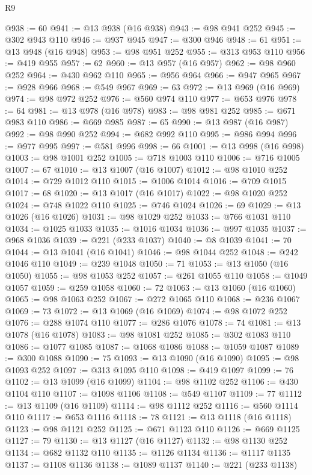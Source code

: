\begin{lexlean}{R9}
\begin{coremodule}
@938 := 60
@941 := @13 @938 (@16 @938)
@943 := @98 @941 @252
@945 := @302 @943 @110
@946 := @937 @945
@947 := @300 @946
@948 := 61
@951 := @13 @948 (@16 @948)
@953 := @98 @951 @252
@955 := @313 @953 @110
@956 := @419 @955
@957 := 62
@960 := @13 @957 (@16 @957)
@962 := @98 @960 @252
@964 := @430 @962 @110
@965 := @956 @964
@966 := @947 @965
@967 := @928 @966
@968 := @549 @967
@969 := 63
@972 := @13 @969 (@16 @969)
@974 := @98 @972 @252
@976 := @560 @974 @110
@977 := @653 @976
@978 := 64
@981 := @13 @978 (@16 @978)
@983 := @98 @981 @252
@985 := @671 @983 @110
@986 := @669 @985
@987 := 65
@990 := @13 @987 (@16 @987)
@992 := @98 @990 @252
@994 := @682 @992 @110
@995 := @986 @994
@996 := @977 @995
@997 := @581 @996
@998 := 66
@1001 := @13 @998 (@16 @998)
@1003 := @98 @1001 @252
@1005 := @718 @1003 @110
@1006 := @716 @1005
@1007 := 67
@1010 := @13 @1007 (@16 @1007)
@1012 := @98 @1010 @252
@1014 := @729 @1012 @110
@1015 := @1006 @1014
@1016 := @709 @1015
@1017 := 68
@1020 := @13 @1017 (@16 @1017)
@1022 := @98 @1020 @252
@1024 := @748 @1022 @110
@1025 := @746 @1024
@1026 := 69
@1029 := @13 @1026 (@16 @1026)
@1031 := @98 @1029 @252
@1033 := @766 @1031 @110
@1034 := @1025 @1033
@1035 := @1016 @1034
@1036 := @997 @1035
@1037 := @968 @1036
@1039 := @221 (@233 @1037)
@1040 := @8 @1039
@1041 := 70
@1044 := @13 @1041 (@16 @1041)
@1046 := @98 @1044 @252
@1048 := @242 @1046 @110
@1049 := @239 @1048
@1050 := 71
@1053 := @13 @1050 (@16 @1050)
@1055 := @98 @1053 @252
@1057 := @261 @1055 @110
@1058 := @1049 @1057
@1059 := @259 @1058
@1060 := 72
@1063 := @13 @1060 (@16 @1060)
@1065 := @98 @1063 @252
@1067 := @272 @1065 @110
@1068 := @236 @1067
@1069 := 73
@1072 := @13 @1069 (@16 @1069)
@1074 := @98 @1072 @252
@1076 := @288 @1074 @110
@1077 := @286 @1076
@1078 := 74
@1081 := @13 @1078 (@16 @1078)
@1083 := @98 @1081 @252
@1085 := @302 @1083 @110
@1086 := @1077 @1085
@1087 := @1068 @1086
@1088 := @1059 @1087
@1089 := @300 @1088
@1090 := 75
@1093 := @13 @1090 (@16 @1090)
@1095 := @98 @1093 @252
@1097 := @313 @1095 @110
@1098 := @419 @1097
@1099 := 76
@1102 := @13 @1099 (@16 @1099)
@1104 := @98 @1102 @252
@1106 := @430 @1104 @110
@1107 := @1098 @1106
@1108 := @549 @1107
@1109 := 77
@1112 := @13 @1109 (@16 @1109)
@1114 := @98 @1112 @252
@1116 := @560 @1114 @110
@1117 := @653 @1116
@1118 := 78
@1121 := @13 @1118 (@16 @1118)
@1123 := @98 @1121 @252
@1125 := @671 @1123 @110
@1126 := @669 @1125
@1127 := 79
@1130 := @13 @1127 (@16 @1127)
@1132 := @98 @1130 @252
@1134 := @682 @1132 @110
@1135 := @1126 @1134
@1136 := @1117 @1135
@1137 := @1108 @1136
@1138 := @1089 @1137
@1140 := @221 (@233 @1138)

\end{coremodule}
\end{lexlean}
